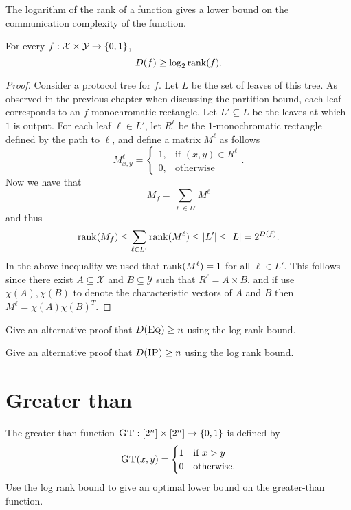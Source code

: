 The logarithm of the rank of a function gives a lower bound on the communication complexity of the function.

\begin{lemma}
\label{lem:logrank}
For every $f : \mathcal{X} \times \mathcal{Y} \to \{0,1\}$,
\[
D(f) \ge \log_2 \mathrm{rank}(f).
\]
\end{lemma}

\begin{proof}
Consider a protocol tree for $f$. Let $L$ be the set of leaves of this tree. As observed in the previous chapter when discussing the partition bound, each leaf corresponds to an $f$-monochromatic rectangle. Let $L'\subseteq L$ be the leaves at which $1$ is output. For each leaf $\ell \in L'$, let $R^\ell$ be the $1$-monochromatic rectangle defined by the path to $\ell$, and define a matrix $M^\ell$ as follows
$$M^\ell_{x,y} = \begin{cases}
1, &\text{if } (x,y) \in R^\ell \\
0, &\text{otherwise}
\end{cases}.$$
Now we have that
$$M_f = \sum_{\ell \in L'} M^\ell$$
and thus
$$\mathrm{rank}(M_f) \leq \sum_{\ell \in L'} \mathrm{rank}(M^\ell) \leq |L'| \leq |L| = 2^{D(f)}.$$
In the above inequality we used that $\mathrm{rank}(M^\ell) = 1$ for all $\ell \in L'$. This follows since there exist $A \subseteq \mathcal{X}$ and $B \subseteq \mathcal{Y}$ such that $R^\ell = A\times B$, and if use $\chi(A), \chi(B)$ to denote the characteristic vectors of $A$ and $B$ then $M^\ell = \chi(A)\chi(B)^T$.
\end{proof}

\exercises

\begin{exercise} %
Give an alternative proof that $D(\textsc{Eq}) \ge n$ using the log rank bound.
\end{exercise}

\begin{exercise}
Give an alternative proof that $D(\textsc{IP}) \ge n$ using the log rank bound.\end{exercise}


\newpage \section{Greater than}

The greater-than function $\textsc{GT} : [2^n] \times [2^n] \to \{0,1\}$ is defined by
\[
\textsc{GT}(x,y) = \begin{cases}
1 & \mbox{if } x > y \\
0 & \mbox{otherwise.}
\end{cases}
\]
Use the log rank bound to give an optimal lower bound on the greater-than function.

